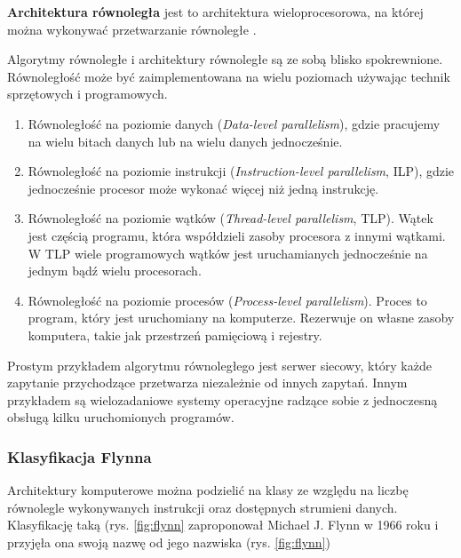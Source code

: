 \begin{definicja}\label{def:arch_rownolegla}
\textbf{Architektura równoległa} jest to architektura wieloprocesorowa, na której można wykonywać przetwarzanie równoległe \cite{IEEE}.
\end{definicja}

Algorytmy równoległe i architektury równoległe są ze sobą blisko spokrewnione. Równoległość może być zaimplementowana na wielu poziomach używając technik sprzętowych i programowych.
\begin{enumerate}
\item{Równoległość na poziomie danych (\emph{Data-level parallelism}), gdzie pracujemy na wielu bitach danych lub na wielu danych jednocześnie.}
\item{Równoległość na poziomie instrukcji (\emph{Instruction-level parallelism}, ILP), gdzie jednocześnie procesor może wykonać więcej niż jedną instrukcję.}
\item{Równoległość na poziomie wątków (\emph{Thread-level parallelism}, TLP). Wątek jest częścią programu, która współdzieli zasoby procesora z innymi wątkami. W TLP wiele programowych wątków jest uruchamianych jednocześnie na jednym bądź wielu procesorach.}
\item{Równoległość na poziomie procesów (\emph{Process-level parallelism}). Proces to program, który jest uruchomiany na komputerze. Rezerwuje on własne zasoby komputera, takie jak przestrzeń pamięciową i rejestry.\cite{APC2011}}
\end{enumerate}

\begin{przyklad}
Prostym przykładem algorytmu równoległego jest serwer siecowy, który każde zapytanie przychodzące przetwarza niezależnie od innych zapytań. Innym przykładem są wielozadaniowe systemy operacyjne radzące sobie z jednoczesną obsługą kilku uruchomionych programów.
\end{przyklad}



\subsubsection{Klasyfikacja Flynna}
Architektury komputerowe można podzielić na klasy ze względu na liczbę równolegle wykonywanych instrukcji oraz dostępnych strumieni danych. Klasyfikację taką (rys. \ref{fig:flynn} zaproponował Michael J. Flynn w 1966 roku i przyjęła ona swoją nazwę od jego nazwiska (rys. \ref{fig:flynn})

